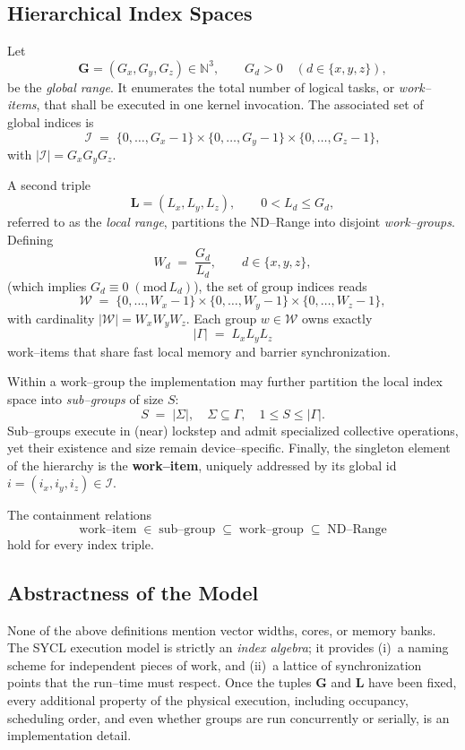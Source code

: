 \subsection{Hierarchical Index Spaces}  Let
\[
   \mathbf{G} = (G_x,G_y,G_z) \in \mathbb{N}^3, \qquad
   G_d > 0\quad(d\in\{x,y,z\}) ,
\]
be the \emph{global range}.  It enumerates the total number of logical tasks, or \emph{work--items}, that shall be executed in one kernel invocation.  The associated set of global indices is
\[
    \mathcal{I} \;=\; \{0,\dots,G_x-1\} \times \{0,\dots,G_y-1\} \times \{0,\dots,G_z-1\},
\]
with
\( |\mathcal{I}| = G_x G_y G_z. \)

A second triple
\[
    \mathbf{L} = (L_x,L_y,L_z), \qquad 0 < L_d \le G_d ,
\]
referred to as the \emph{local range}, partitions the ND--Range into disjoint \emph{work--groups}.  Defining
\[
    W_d \;=\; \frac{G_d}{L_d},\qquad d\in\{x,y,z\},
\]
(which implies $G_d \equiv 0\; (\mathrm{mod}\,L_d)$), the set of group indices reads
\[
    \mathcal{W} \;=\; \{0,\dots,W_x-1\} \times \{0,\dots,W_y-1\} \times \{0,\dots,W_z-1\},
\]
with cardinality $|\mathcal{W}|=W_x W_y W_z$.  Each group $w\in\mathcal{W}$ owns exactly
\[
    |\Gamma| \;=\; L_x L_y L_z
\]
work--items that share fast local memory and barrier synchronization.

Within a work--group the implementation may further partition the local index space into \emph{sub--groups} of size $S$:
\[
    S \;=\; |\Sigma|,\quad \Sigma \subseteq \Gamma,\quad 1\le S\le |\Gamma|.
\]
Sub--groups execute in (near) lockstep and admit specialized collective operations, yet their existence and size remain device--specific.  Finally, the singleton element of the hierarchy is the \textbf{work--item}, uniquely addressed by its global id $i=(i_x,i_y,i_z)\in\mathcal{I}$.

The containment relations
\[
    \text{work--item} \;\in\; \text{sub--group} \;\subseteq\; \text{work--group} \;\subseteq\; \text{ND--Range}
\]
hold for every index triple.

\subsection{Abstractness of the Model}  None of the above definitions mention vector widths, cores, or memory banks.  The SYCL execution model is strictly an \emph{index algebra}; it provides (i)~a naming scheme for independent pieces of work, and (ii)~a lattice of synchronization points that the run--time must respect.  Once the tuples $\mathbf{G}$ and $\mathbf{L}$ have been fixed, every additional property of the physical execution, including occupancy, scheduling order, and even whether groups are run concurrently or serially, is an implementation detail.

